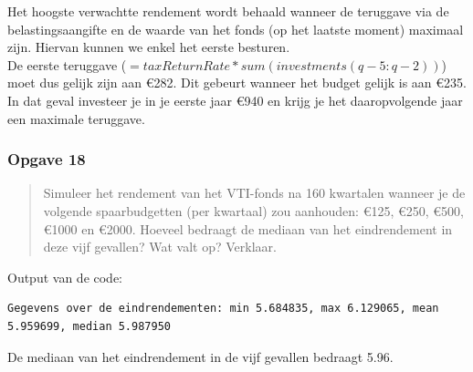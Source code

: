 \documentclass[11pt, a4paper, titlepage, openright]{article}
\begin{document}
		\noindent Het hoogste verwachtte rendement wordt behaald wanneer de teruggave via de belastingsaangifte en
		de waarde van het fonds (op het laatste moment) maximaal zijn. Hiervan kunnen we enkel het eerste besturen. \\
		De eerste teruggave (\( = taxReturnRate * sum(investments(q-5:q-2)) \)) moet dus gelijk zijn aan \euro282.
		Dit gebeurt wanneer het budget gelijk is aan \euro 235. In dat geval investeer je in je eerste jaar \euro 940 en
		krijg je het daaropvolgende jaar een maximale teruggave.

	\newpage
	\subsubsection{Opgave 18}
		\begin{quote}
			Simuleer het rendement van het VTI-fonds na 160 kwartalen wanneer je de volgende spaarbudgetten
			(per kwartaal) zou aanhouden: \euro125, \euro250, \euro500, \euro1000 en \euro2000. Hoeveel bedraagt de
			mediaan van het eindrendement in deze vijf gevallen? Wat valt op? Verklaar.
		\end{quote}


		\noindent Output van de code:
\begin{lstlisting}
Gegevens over de eindrendementen: min 5.684835, max 6.129065, mean 5.959699, median 5.987950\end{lstlisting}
		De mediaan van het eindrendement in de vijf gevallen bedraagt 5.96.
\end{document}
